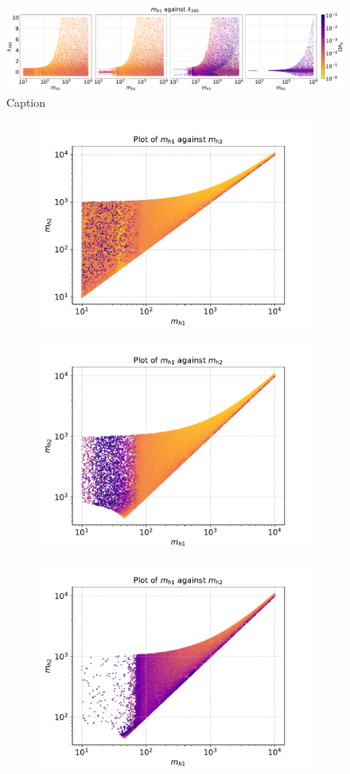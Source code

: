 \documentclass[12pt]{article}
\begin{document}
\newpage
\onecolumn
\begin{figure}[H]
    \centering
    \includegraphics[width=\columnwidth]{4plot/MD1_l345.pdf}
    \caption{Caption}
    \label{fig:enter-label}
\end{figure}
\begin{figure}[H]
    \begin{subfigure}{\textwidth}
      \centering
      \includegraphics[width=0.5\columnwidth]
      {plots/MD1_MD2_cut1.pdf}
    \end{subfigure}%
    \begin{subfigure}{\textwidth}
      \centering
      \includegraphics[width=0.5\columnwidth]{plots/MD1_MD2_cut1cut2.pdf}
    \end{subfigure}
    \begin{subfigure}{\textwidth}
      \centering
      \includegraphics[width=0.5\columnwidth]{plots/MD1_MD2_cut1cut2cut3.pdf}

\end{subfigure}
\end{figure}
\end{document}
